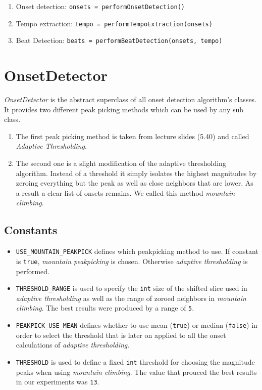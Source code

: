 \begin{enumerate}
  \item Onset detection: \texttt{onsets = performOnsetDetection()}
  \item Tempo extraction: \texttt{tempo = performTempoExtraction(onsets)}
  \item Beat Detection: \texttt{beats = performBeatDetection(onsets, tempo)}
\end{enumerate}

\section{\ttfamily OnsetDetector}
\emph{OnsetDetector} is the abstract superclass of all onset detection
algorithm's classes. It provides two different peak picking methods which can be
used by any sub class.

\begin{enumerate}
  \item The first peak picking method is taken from lecture slides (5.40) and
  called \emph{Adaptive Thresholding}.
  \item The second one is a slight modification of the adaptive thresholding
  algorithm. Instead of a threshold it simply isolates the highest magnitudes by
  zeroing everything but the peak as well as close neighbors that are lower. As
  a result a clear list of onsets remains. We called this method \emph{mountain
  climbing}.
\end{enumerate}

\subsection*{Constants}
\begin{itemize}
  \item \texttt{USE\_MOUNTAIN\_PEAKPICK} defines which peakpicking method to
  use. If constant is \texttt{true}, \emph{mountain peakpicking} is chosen.
  Otherwise \emph{adaptive thresholding} is performed.
  \item \texttt{THRESHOLD\_RANGE} is used to specify the \texttt{int} size of
  the shifted slice used in \emph{adaptive thresholding} as well as the range of
  zoroed neighbors in \emph{mountain climbing}. The best results were produced
  by a range of \texttt{5}.
  \item \texttt{PEAKPICK\_USE\_MEAN} defines whether to use mean
  (\texttt{true}) or median (\texttt{false}) in order to select the threshold
  that is later on applied to all the onset calculations of \emph{adaptive
  thresholding}.
  \item \texttt{THRESHOLD} is used to define a fixed \texttt{int} threshold for
  choosing the magnitude peaks when using \emph{mountain climbing}. The value
  that prouced the best results in our experiments was \texttt{13}. 
\end{itemize}


